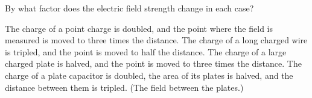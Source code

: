 By what factor does the electric field strength change in each case?

\begin{abcliste}
\abc The charge of a point charge is doubled, and the point where the field is measured is moved to three times the distance.
\abc The charge of a long charged wire is tripled, and the point is moved to half the distance.
\abc The charge of a large charged plate is halved, and the point is moved to three times the distance.
\abc The charge of a plate capacitor is doubled, the area of its plates is halved, and the distance between them is tripled. (The field between the plates.)
\end{abcliste}
